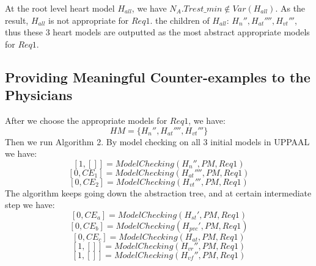 At the root level heart model $H_{all}$, we have $N_A.Trest\_min\not\in Var(H_{all})$. As the result, $H_{all}$ is not appropriate for $Req1$.  the children of $H_{all}$: $H_n'',H_{at}'''',H_{vt}'''$, thus these 3 heart models are outputted as the most abstract appropriate models for $Req1$.
\subsection{Providing Meaningful Counter-examples to the Physicians}
After we choose the appropriate models for $Req1$, we have: 
$$HM=\{H_n'',H_{at}'''',H_{vt}'''\}$$
Then we run Algorithm 2. By model checking on all 3 initial models in UPPAAL we have: 
$$[1,[]]=ModelChecking(H_n'',PM,Req1)$$
 $$[0,CE_1]=ModelChecking(H_{at}'''',PM,Req1)$$
$$[0,CE_2]=ModelChecking(H_{vt}''',PM,Req1)$$
The algorithm keeps going down the abstraction tree, and at certain intermediate step we have:
 $$[0,CE_a]=ModelChecking(H_{st}',PM,Req1)$$
  $$[0,CE_b]=ModelChecking(H_{pvc}',PM,Req1)$$
	$$[0,CE_c]=ModelChecking(H_{at},PM,Req1)$$
 $$[1,[]]=ModelChecking(H_{vr}'',PM,Req1)$$
 $$[1,[]]=ModelChecking(H_{vf}'',PM,Req1)$$

